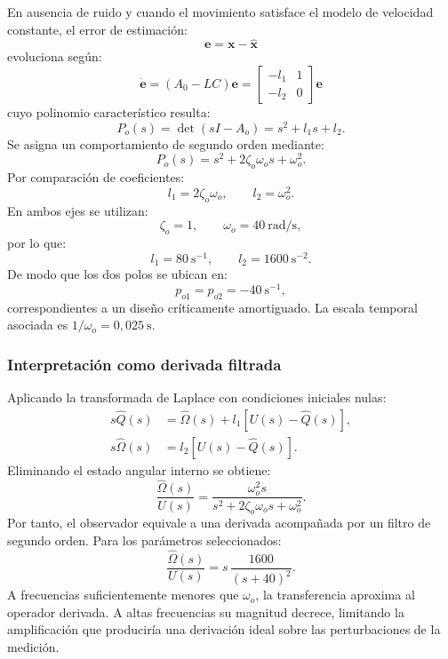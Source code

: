 \documentclass[a4paper,10pt,onecolumn,journal]{ieeeconf}
\numberwithin{equation}{section}
\begin{document}
En ausencia de ruido y cuando el movimiento satisface el modelo de velocidad constante, el error de estimación:
\begin{equation}
\boldsymbol e=\boldsymbol x-\hat{\boldsymbol x}
\end{equation}
evoluciona según:
\begin{equation}
\dot{\boldsymbol e}=(A_0-LC)\boldsymbol e =
\begin{bmatrix}-l_1&1\\-l_2&0\end{bmatrix} \boldsymbol e
\end{equation}
cuyo polinomio característico resulta:
\begin{equation}
P_o(s)=\det(sI-A_o)=s^2+l_1s+l_2.
\end{equation}
Se asigna un comportamiento de segundo orden mediante:
\begin{equation}
P_o(s)=s^2+2\zeta_o\omega_os+\omega_o^2.
\end{equation}
Por comparación de coeficientes:
\begin{equation}
\boxed{l_1=2\zeta_o\omega_o,\qquad l_2=\omega_o^2}.
\end{equation}
En ambos ejes se utilizan:
\begin{equation}
\zeta_o=1,\qquad \omega_o=40\ \mathrm{rad/s},
\end{equation}
por lo que:
\begin{equation}
l_1=80\ \mathrm{s^{-1}},\qquad l_2=1600\ \mathrm{s^{-2}}.
\end{equation}
De modo que los dos polos se ubican en:
\begin{equation}
\boxed{p_{o1}=p_{o2}=-40\ \mathrm{s^{-1}}},
\end{equation}
correspondientes a un diseño críticamente amortiguado. La escala temporal asociada es $1/\omega_o=0{,}025\ \mathrm{s}$.

\subsubsection{Interpretación como derivada filtrada}

Aplicando la transformada de Laplace con condiciones iniciales nulas:
\begin{align}
s\hat Q(s)&=\hat\Omega(s)+l_1\left[U(s)-\hat Q(s)\right],\\
s\hat\Omega(s)&=l_2\left[U(s)-\hat Q(s)\right].
\end{align}
Eliminando el estado angular interno se obtiene:
\begin{equation}
\frac{\hat\Omega(s)}{U(s)}=
\frac{\omega_o^2s}{s^2+2\zeta_o\omega_os+\omega_o^2}.
\end{equation}
Por tanto, el observador equivale a una derivada acompañada por un filtro de segundo orden. Para los parámetros seleccionados:
\begin{equation}
\frac{\hat\Omega(s)}{U(s)}=s\,\frac{1600}{(s+40)^2}.
\end{equation}
A frecuencias suficientemente menores que $\omega_o$, la transferencia aproxima al operador derivada. A altas frecuencias su magnitud decrece, limitando la amplificación que produciría una derivación ideal sobre las perturbaciones de la medición.
\end{document}
